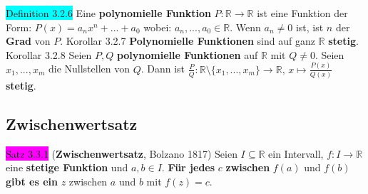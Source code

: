 \documentclass[landscape, 10pt]{article}
\newcommand{\R}{\mathbb{R}}
\begin{document}
\begin{multicols}{3}
              \colorbox{cyan}{Definition 3.2.6} 
                     Eine \textbf{polynomielle Funktion} 
                     \textcolor{NavyBlue}{$P:\R\longrightarrow\R$} 
                     ist eine Funktion 
                     der Form: \textcolor{NavyBlue}{$P(x)=a_nx^n+...+a_0$}
                     wobei: \textcolor{NavyBlue}{$a_n,...,a_0\in\R$}. 
                     Wenn \textcolor{NavyBlue}{$a_n\neq0$} ist, ist 
                     \textcolor{NavyBlue}{$n$} 
                     der \textbf{Grad} von \textcolor{NavyBlue}{$P$}.
              \colorbox{BurntOrange}{Korollar 3.2.7} 
                     \textbf{Polynomielle Funktionen} 
                     sind auf ganz $\R$ \textbf{stetig}.\\
              \colorbox{BurntOrange}{Korollar 3.2.8} 
                     Seien $P,Q$ \textbf{polynomielle Funktionen} 
                     auf $\R$ mit \textcolor{NavyBlue}{$Q\neq0$}. Seien 
                     \textcolor{NavyBlue}{$x_1,...,x_m$} die Nullstellen von 
                     \textcolor{NavyBlue}{$Q$}. 
                     Dann ist \textcolor{NavyBlue}{
                     $\frac{P}{Q}:\R\setminus\{x_1,...,x_m\}\longrightarrow\R,\,
                     x\longmapsto\frac{P(x)}{Q(x)}$} \textbf{stetig}.\\
       \subsection{Zwischenwertsatz}
              \colorbox{magenta}{Satz 3.3.1} (\textbf{Zwischenwertsatz}, Bolzano 1817) Seien 
                     \textcolor{NavyBlue}{$I\subseteq\R$} ein Intervall, 
                     \textcolor{NavyBlue}{$f:I\longrightarrow\R$} 
                     eine \textbf{stetige Funktion} und 
                     \textcolor{NavyBlue}{$a,b\in I$}. 
                     \textbf{Für jedes} \textcolor{NavyBlue}{$c$} \textbf{zwischen} 
                     \textcolor{NavyBlue}{$f(a)$} und \textcolor{NavyBlue}{$f(b)$} 
                     \textbf{gibt es ein} \textcolor{NavyBlue}{$z$} 
                     zwischen \textcolor{NavyBlue}{$a$} und \textcolor{NavyBlue}{$b$} mit 
                     \textcolor{NavyBlue}{$f(z)=c$}.

\end{multicols}
\end{document}
